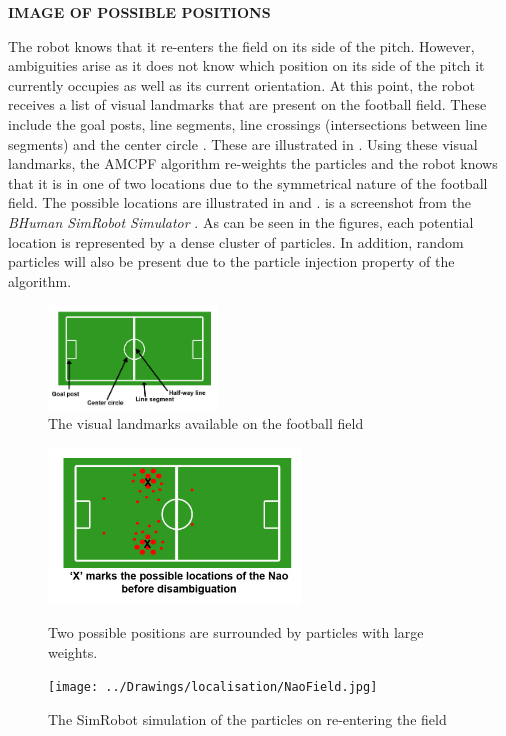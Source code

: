 \documentclass[11pt]{report}
\begin{document}
\textbf{IMAGE OF POSSIBLE POSITIONS}

The robot knows that it re-enters the field on its side of the pitch. However, ambiguities arise as it does not know which position on its side of the pitch it currently occupies as well as its current orientation. At this point, the robot receives a list of visual landmarks that are present on the football field. These include the goal posts, line segments, line crossings (intersections between line segments) and the center circle \cite{Bhuman}. These are illustrated in . Using these visual landmarks, the AMCPF algorithm re-weights the particles and the robot knows that it is in one of two locations due to the symmetrical nature of the football field. The possible locations are illustrated in  and .  is a screenshot from the \textit{BHuman SimRobot Simulator} \cite{Bhuman}. As can be seen in the figures, each potential location is represented by a dense cluster of particles. In addition, random particles will also be present due to the particle injection property of the algorithm.\\

\begin{figure}[ht!]
  \centering
    \includegraphics[width=0.4\textwidth]{../Drawings/localisation/goalSetup.jpg}
    \caption{The visual landmarks available on the football field} 
    \label{fig:localiseLandmarks}
\end{figure}

\begin{figure}[ht!]
\begin{minipage}[b]{0.5\linewidth}
  \centering
    \includegraphics[width=0.6\textwidth]{../Drawings/localisation/beforeDisambiguate.jpg}
    \caption{Two possible positions are surrounded by particles with large weights.} 
    \label{fig:before}
\end{minipage}
\begin{minipage}[b]{0.5\linewidth}
  \centering
    \texttt{[image: ../Drawings/localisation/NaoField.jpg]}
    \caption{The SimRobot simulation of the particles on re-entering the field}
    \label{fig:beforeSim}
\end{minipage}
\end{figure}
\end{document}
